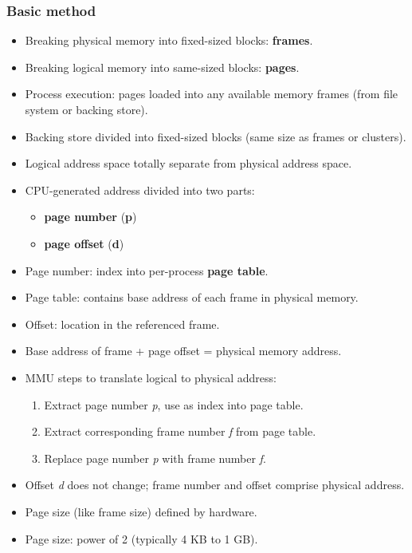\subsubsection*{Basic method}
\begin{itemize}
    \item Breaking physical memory into fixed-sized blocks: \textbf{frames}.
    \item Breaking logical memory into same-sized blocks: \textbf{pages}.
    \item Process execution: pages loaded into any available memory frames (from file system or backing store).
    \item Backing store divided into fixed-sized blocks (same size as frames or clusters).
    \item Logical address space totally separate from physical address space.
    \item CPU-generated address divided into two parts:
    \begin{itemize}
        \item \textbf{page number} (\textbf{p})
        \item \textbf{page offset} (\textbf{d})
    \end{itemize}
    \item Page number: index into per-process \textbf{page table}.
    \item Page table: contains base address of each frame in physical memory.
    \item Offset: location in the referenced frame.
    \item Base address of frame + page offset = physical memory address.
    \item MMU steps to translate logical to physical address:
    \begin{enumerate}
        \item Extract page number \textit{p}, use as index into page table.
        \item Extract corresponding frame number \textit{f} from page table.
        \item Replace page number \textit{p} with frame number \textit{f}.
    \end{enumerate}
    \item Offset \textit{d} does not change; frame number and offset comprise physical address.
    \item Page size (like frame size) defined by hardware.
    \item Page size: power of 2 (typically 4 KB to 1 GB).

\end{itemize}
